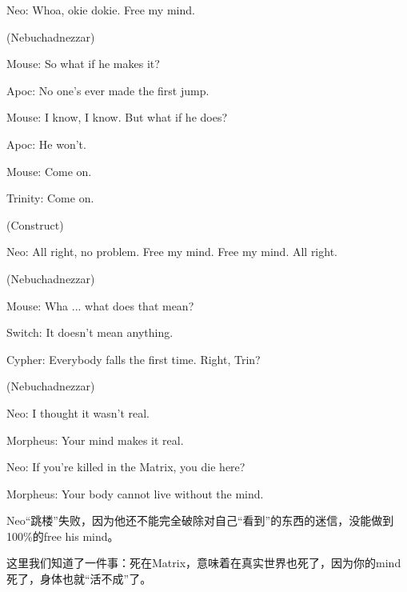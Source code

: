 \documentclass{ctexart}
\newenvironment{myquote}{\color{green} \setlength{\leftskip}{6em} \setlength{\rightskip}{4em} \setlength{\parindent}{-2em}}{\par}
\begin{document}
\begin{myquote}
Neo: Whoa, okie dokie. Free my mind.

(Nebuchadnezzar)

Mouse: So what if he makes it?

Apoc: No one's ever made the first jump.

Mouse: I know, I know. But what if he does?

Apoc: He won't.

Mouse: Come on.

Trinity: Come on.

(Construct)

Neo: All right, no problem. Free my mind. Free my mind. All right.

(Nebuchadnezzar)

Mouse: Wha ... what does that mean?

Switch: It doesn't mean anything.

Cypher: Everybody falls the first time. Right, Trin?

(Nebuchadnezzar)

Neo: I thought it wasn't real.

Morpheus: Your mind makes it real.

Neo: If you're killed in the Matrix, you die here?

Morpheus: Your body cannot live without the mind.
\end{myquote}

Neo“跳楼”失败，因为他还不能完全破除对自己“看到”的东西的迷信，没能做到100\%的free his mind。

这里我们知道了一件事：死在Matrix，意味着在真实世界也死了，因为你的mind死了，身体也就“活不成”了。
\end{document}
